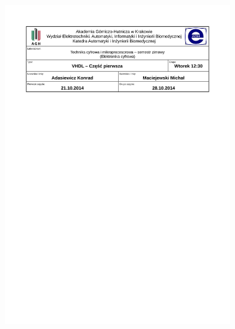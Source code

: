 \documentclass[12pt]{article}
\begin{document}
\begin{center}
	\includegraphics[trim=5cm 21cm 5cm 2cm,width=10cm]{../res/img/table.pdf} 
\end{center}
\end{document}
